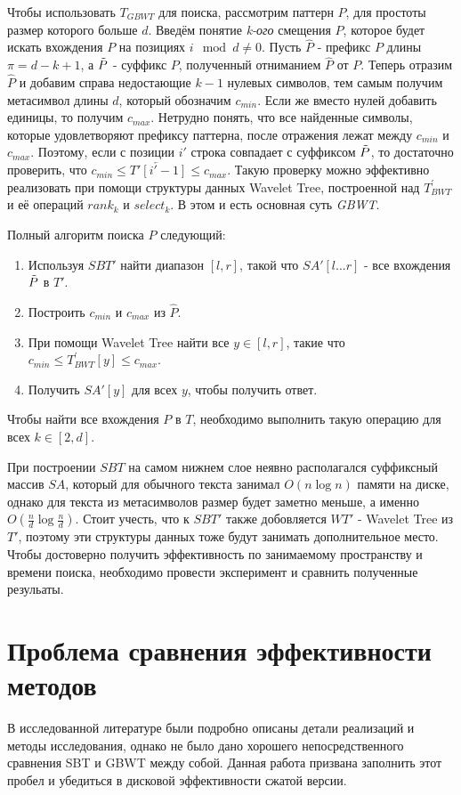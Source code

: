 \documentclass[a4paper,12pt]{article}
\begin{document}
Чтобы использовать $T_{GBWT}$ для поиска, рассмотрим паттерн $P$, для простоты размер которого больше $d$. Введём понятие \textit{k-ого} смещения $P$, которое будет искать вхождения $P$ на позициях $i \mod{d} \neq 0$. Пусть $\widehat{P}$ - префикс $P$ длины $\pi = d - k + 1$, а $\Tilde{P}$ - суффикс $P$, полученный отниманием $\widehat{P}$ от $P$. Теперь отразим $\widehat{P}$ и добавим справа недостающие $k - 1$ нулевых символов, тем самым получим метасимвол длины $d$, который обозначим $c_{min}$. Если же вместо нулей добавить единицы, то получим $c_{max}$. Нетрудно понять, что все найденные символы, которые удовлетворяют префиксу паттерна, после отражения лежат между $c_{min}$ и $c_{max}$. Поэтому, если с позиции $i'$ строка совпадает с суффиксом $\Tilde{P}$, то достаточно проверить, что $c_{min} \le \overleftarrow{T'[i'-1]} \le c_{max}$. Такую проверку можно эффективно реализовать при помощи структуры данных Wavelet Tree, построенной над $T_{BWT}^{'}$ и её операций $rank_k$ и $select_k$. В этом и есть основная суть \textit{GBWT}. 

Полный алгоритм поиска $P$ следующий:
\begin{enumerate}
    \item Используя $SBT'$ найти диапазон $[l, r]$, такой что $SA'[l...r]$ - все вхождения $\Tilde{P}$ в $T'$.
    \item Построить $c_{min}$ и $c_{max}$ из $\widehat{P}$.
    \item При помощи Wavelet Tree найти все $y \in [l, r]$, такие что  $c_{min} \le T_{BWT}^{'}[y] \le c_{max}$.
    \item Получить $SA'[y]$ для всех $y$, чтобы получить ответ.
\end{enumerate}
Чтобы найти все вхождения $P$ в $T$, необходимо выполнить такую операцию для всех $k \in [2, d]$. 

При построении $SBT$ на самом нижнем слое неявно располагался суффиксный массив $SA$, который для обычного текста занимал $O(n \log n)$ памяти на диске, однако для текста из метасимволов размер будет заметно меньше, а именно $O(\frac{n}{d} \log{\frac{n}{d}})$. Стоит учесть, что к $SBT'$ также добовляется $WT'$ - Wavelet Tree из $T'$, поэтому эти структуры данных тоже будут занимать дополнительное место. Чтобы достоверно получить эффективность по занимаемому пространству и времени поиска, необходимо провести эксперимент и сравнить полученные резульаты.

\section{Проблема сравнения эффективности методов}
В исследованной литературе\cite{ferragina1999string}\cite{chien2008geometric} были подробно описаны детали реализаций и методы исследования, однако не было дано хорошего непосредственного сравнения SBT и GBWT между собой. Данная работа призвана заполнить этот пробел и убедиться в дисковой эффективности сжатой версии.
\end{document}
